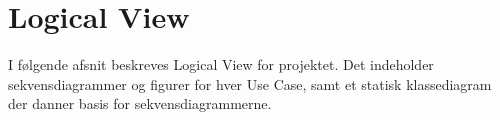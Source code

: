 \documentclass[Main]{subfiles}
\begin{document}
\section{Logical View}
I følgende afsnit beskreves Logical View for projektet.
Det indeholder sekvensdiagrammer og figurer for hver Use Case, samt et statisk klassediagram der danner basis for sekvensdiagrammerne.




\newpage

\end{document}
